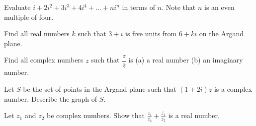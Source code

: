 \documentclass[../book.tex]{subfiles}
\begin{document}
\begin{reviewset}
\item Evaluate $i+2i^2+3i^3+4i^4+\ldots+ni^n$ in terms of $n$.  Note that $n$ is an even multiple of four.\vspace{3mm}

\item Find all real numbers $k$ such that $3+i$ is five units from $6+ki$ on the Argand plane.\vspace{3mm}

\item Find all complex numbers $z$ such that $\dfrac{z}{\overline{z}}$ is \newline 
{\centering (a) a real number \hspace{55mm} (b) an imaginary number.}
\item Let $S$ be the set of points in the Argand plane such that $(1+2i)z$ is a complex number.  Describe the graph of $S$.  \vspace{3mm}

\item Let $z_1$ and $z_2$ be complex numbers.  Show that $\displaystyle \frac{z_1}{\overline{z_2}}+\frac{\overline{z_1}}{z_2}$ is a real number.  \vspace{3mm}
\end{reviewset}
\end{document}
